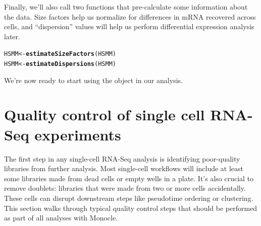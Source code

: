 \documentclass[10pt,oneside]{article}\usepackage[]{graphicx}\usepackage[]{color}
\makeatletter
\newcommand{\hlstd}[1]{\textcolor[rgb]{0.345,0.345,0.345}{#1}}%
\newcommand{\hlkwb}[1]{\textcolor[rgb]{0.69,0.353,0.396}{#1}}%
\newcommand{\hlkwd}[1]{\textcolor[rgb]{0.737,0.353,0.396}{\textbf{#1}}}%
\newenvironment{kframe}{%
 \def\at@end@of@kframe{}%
 \ifinner\ifhmode%
  \def\at@end@of@kframe{\end{minipage}}%
  \begin{minipage}{\columnwidth}%
 \fi\fi%
 \def\FrameCommand##1{\hskip\@totalleftmargin \hskip-\fboxsep
 \colorbox{shadecolor}{##1}\hskip-\fboxsep
     \hskip-\linewidth \hskip-\@totalleftmargin \hskip\columnwidth}%
 \MakeFramed {\advance\hsize-\width
   \@totalleftmargin\z@ \linewidth\hsize
   \@setminipage}}%
 {\par\unskip\endMakeFramed%
 \at@end@of@kframe}
\newenvironment{knitrout}{}{} %
\makeatother
\begin{document}
Finally, we'll also call two functions that pre-calculate some information about the data. Size factors help us normalize for differences in mRNA recovered across cells, and ``dispersion'' values will help us perform differential expression analysis later.
\begin{knitrout}
\color{fgcolor}\begin{kframe}
\begin{alltt}
\hlstd{HSMM} \hlkwb{<-} \hlkwd{estimateSizeFactors}\hlstd{(HSMM)}
\hlstd{HSMM} \hlkwb{<-} \hlkwd{estimateDispersions}\hlstd{(HSMM)}
\end{alltt}
\end{kframe}
\end{knitrout}
We're now ready to start using the  object in our analysis.

\section{Quality control of single cell RNA-Seq experiments}
The first step in any single-cell RNA-Seq analysis is identifying poor-quality libraries from further analysis. Most single-cell workflows will include at least some libraries made from dead cells or empty wells in a plate. It's also crucial to remove doublets: libraries that were made from two or more cells accidentally. These cells can disrupt downstream steps like pseudotime ordering or clustering. This section walks through typical quality control steps that should be performed as part of all analyses with Monocle.
\end{document}
